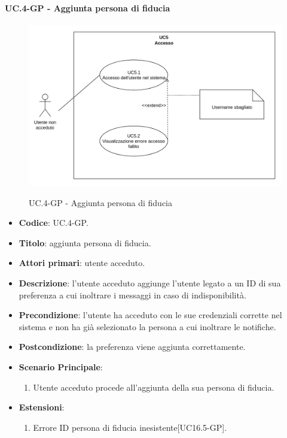			\paragraph{UC\theuccount.4-GP - Aggiunta persona di fiducia}
				\begin{figure}[H]
					\centering
					\includegraphics[width=\columnwidth]{img/UC5.png}\\
					\caption{UC\theuccount.4-GP - Aggiunta persona di fiducia}
				\end{figure}
				\begin{itemize}
					\item \textbf{Codice}: UC\theuccount.4-GP.
					\item \textbf{Titolo}: aggiunta persona di fiducia.
					\item \textbf{Attori primari}: utente acceduto.
					\item \textbf{Descrizione}: l’utente acceduto aggiunge l'utente legato a un ID di sua preferenza a
					cui inoltrare i messaggi in caso di indisponibilità.
					\item \textbf{Precondizione}: l’utente ha acceduto con le sue credenziali corrette nel
					sistema e non ha già selezionato la persona a cui inoltrare le notifiche.
					\item \textbf{Postcondizione}: la preferenza viene aggiunta correttamente.
					\item \textbf{Scenario Principale}:
					\begin{enumerate}
						\item Utente acceduto procede all'aggiunta della sua persona di fiducia.
					\end{enumerate}
					\item \textbf{Estensioni}:
					\begin{enumerate}
						\item Errore ID persona di fiducia inesistente[UC16.5-GP].
					\end{enumerate}
				\end{itemize}
			

